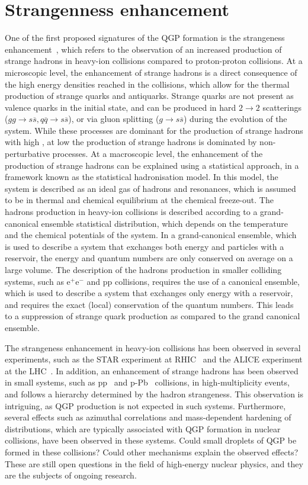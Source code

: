 \section{Strangenness enhancement}
One of the first proposed signatures of the QGP formation is the strangeness enhancement~\cite{Rafelski:1982pu}, which refers to the observation of an increased production of strange hadrons in heavy-ion collisions compared to proton-proton collisions. At a microscopic level, the enhancement of strange hadrons is a direct consequence of the high energy densities reached in the collisions, which allow for the thermal production of strange quarks and antiquarks. Strange quarks are not present as valence quarks in the initial state, and can be produced in hard $2\rightarrow 2$ scatterings ($gg\rightarrow s\overline{s}, q\overline{q}\rightarrow s\overline{s}$), or via gluon splitting ($g\rightarrow s\overline{s}$) during the evolution of the system. While these processes are dominant for the production of strange hadrons with high \pt, at low \pt the production of strange hadrons is dominated by non-perturbative processes. At a macroscopic level, the enhancement of the production of strange hadrons can be explained using a statistical approach, in a framework known as the statistical hadronisation model. In this model, the system is described as an ideal gas of hadrons and resonances, which is assumed to be in thermal and chemical equilibrium at the chemical freeze-out. The hadrons production in heavy-ion collisions is described according to a grand-canonical ensemble statistical distribution, which depends on the temperature and the chemical potentials of the system. In a grand-canonical ensemble, which is used to describe a system that exchanges both energy and particles with a reservoir, the energy and quantum numbers are only conserved on average on a large volume. The description of the hadrons production in smaller colliding systems, such as $\mathrm{e^+e^-}$ and pp collisions, requires the use of a canonical ensemble, which is used to describe a system that exchanges only energy with a reservoir, and requires the exact (local) conservation of the quantum numbers. This leads to a suppression of strange quark production as compared to the grand canonical ensemble. 

The strangeness enhancement in heavy-ion collisions has been observed in several experiments, such as the STAR experiment at RHIC~\cite{STAR:2007cqw} and the ALICE experiment at the LHC~\cite{ALICE:2013xmt}. In addition, an enhancement of strange hadrons has been observed in small systems, such as pp~\cite{ALICE:2016fzo} and p-Pb~\cite{ALICE:2013wgn, ALICE:2015mpp} collisions, in high-multiplicity events, and follows a hierarchy determined by the hadron strangeness. This observation is intriguing, as QGP production is not expected in such systems. Furthermore, several effects such as azimuthal correlations and mass-dependent hardening of \pt distributions, which are typically associated with QGP formation in nuclear collisions, have been observed in these systems. Could small droplets of QGP be formed in these collisions? Could other mechanisms explain the observed effects? These are still open questions in the field of high-energy nuclear physics, and they are the subjects of ongoing research.


